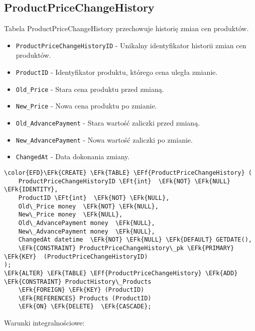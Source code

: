 \documentclass[11pt]{article}
\newcommand{\EFk}[1]{\textcolor{EFk}{\textbf{#1}}} %
\newcommand{\EFf}[1]{\textcolor{EFf}{#1}} %
\newcommand{\EFt}[1]{\textcolor{EFt}{\textbf{#1}}} %
\begin{document}
\subsection{ProductPriceChangeHistory}
\label{sec:org9b99add}
Tabela ProductPriceChangeHistory przechowuje historię zmian cen produktów.
\begin{itemize}
\item \texttt{ProductPriceChangeHistoryID} - Unikalny identyfikator historii zmian cen produktów.
\item \texttt{ProductID} - Identyfikator produktu, którego cena uległa zmianie.
\item \texttt{Old\_Price} - Stara cena produktu przed zmianą.
\item \texttt{New\_Price} - Nowa cena produktu po zmianie.
\item \texttt{Old\_AdvancePayment} - Stara wartość zaliczki przed zmianą.
\item \texttt{New\_AdvancePayment} - Nowa wartość zaliczki po zmianie.
\item \texttt{ChangedAt} - Data dokonania zmiany.
\end{itemize}
\begin{Code}
\begin{Verbatim}
\color{EFD}\EFk{CREATE} \EFk{TABLE} \EFf{ProductPriceChangeHistory} (
    ProductPriceChangeHistoryID \EFt{int}  \EFk{NOT} \EFk{NULL} \EFk{IDENTITY},
    ProductID \EFt{int}  \EFk{NOT} \EFk{NULL},
    Old\_Price money  \EFk{NOT} \EFk{NULL},
    New\_Price money  \EFk{NULL},
    Old\_AdvancePayment money  \EFk{NULL},
    New\_AdvancePayment money  \EFk{NULL},
    ChangedAt datetime  \EFk{NOT} \EFk{NULL} \EFk{DEFAULT} GETDATE(),
    \EFk{CONSTRAINT} ProductPriceChangeHistory\_pk \EFk{PRIMARY} \EFk{KEY}  (ProductPriceChangeHistoryID)
);
\EFk{ALTER} \EFk{TABLE} \EFf{ProductPriceChangeHistory} \EFk{ADD} \EFk{CONSTRAINT} ProductHistory\_Products
    \EFk{FOREIGN} \EFk{KEY} (ProductID)
    \EFk{REFERENCES} Products (ProductID)
    \EFk{ON} \EFk{DELETE}  \EFk{CASCADE};
\end{Verbatim}
\end{Code}
Warunki integralnościowe:
\end{document}
